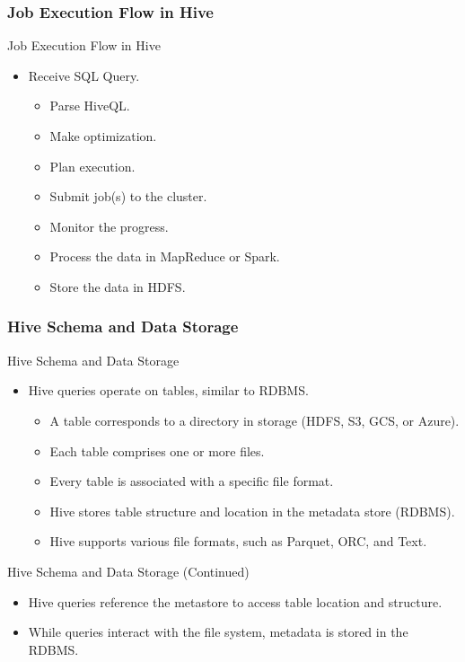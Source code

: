 \subsubsection{Job Execution Flow in Hive}
\begin{frame}{Job Execution Flow in Hive}
	\begin{itemize}
		\item Receive SQL Query.
		\begin{itemize}
			\item Parse HiveQL.
			\item Make optimization.
			\item Plan execution.
			\item Submit job(s) to the cluster.
			\item Monitor the progress.
			\item Process the data in MapReduce or Spark.
			\item Store the data in HDFS.
		\end{itemize}
	\end{itemize}
	\end{frame}
\subsubsection{Hive Schema and Data Storage}
\begin{frame}{Hive Schema and Data Storage}
	\begin{itemize}
		\item Hive queries operate on tables, similar to RDBMS.
		\begin{itemize}
			\item A table corresponds to a directory in storage (HDFS, S3, GCS, or Azure).
			\item Each table comprises one or more files.
			\item Every table is associated with a specific file format.
			\item Hive stores table structure and location in the metadata store (RDBMS).
			\item Hive supports various file formats, such as Parquet, ORC, and Text.
		\end{itemize}
	\end{itemize}
\end{frame}

\begin{frame}{Hive Schema and Data Storage (Continued)}
	\begin{itemize}
		\item Hive queries reference the metastore to access table location and structure.
		\item While queries interact with the file system, metadata is stored in the RDBMS.
	\end{itemize}
\end{frame}

